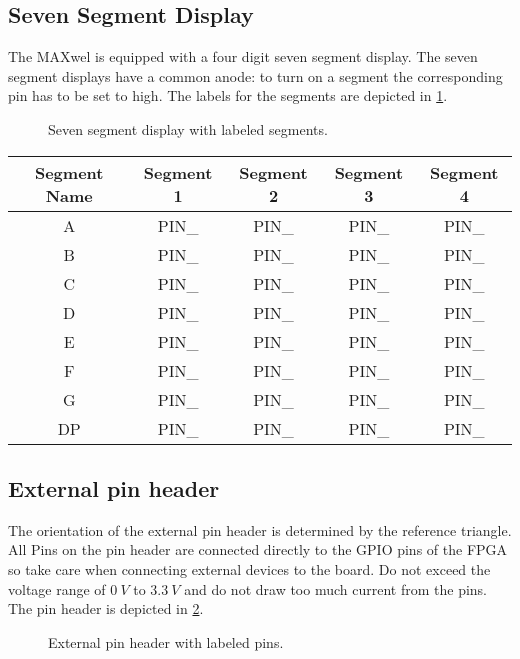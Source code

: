 \subsection{Seven Segment Display}
The MAXwel is equipped with a four digit seven segment display.
The seven segment displays have a common anode: to turn on a segment the corresponding pin has to be set to high.
The labels for the segments are depicted in \cref{fig:seven_segment_display}.

\begin{figure}[h!]
    \centering
    
    \caption{Seven segment display with labeled segments.}
    \label{fig:seven_segment_display}
\end{figure}

\begin{center}
	\begin{tabular}{c c c c c}
		Segment Name & Segment 1 & Segment 2 & Segment 3 & Segment 4 \\
		\hline
		A & PIN\_ & PIN\_ & PIN\_ & PIN\_ \\
		B & PIN\_ & PIN\_ & PIN\_ & PIN\_ \\
		C & PIN\_ & PIN\_ & PIN\_ & PIN\_ \\
		D & PIN\_ & PIN\_ & PIN\_ & PIN\_ \\
		E & PIN\_ & PIN\_ & PIN\_ & PIN\_ \\
		F & PIN\_ & PIN\_ & PIN\_ & PIN\_ \\
		G & PIN\_ & PIN\_ & PIN\_ & PIN\_ \\
		DP & PIN\_ & PIN\_ & PIN\_ & PIN\_ \\
		\hline
	\end{tabular}
\end{center}

\subsection{External pin header}
The orientation of the external pin header is determined by the reference triangle.
All Pins on the pin header are connected directly to the GPIO pins of the FPGA so take care when connecting external devices to the board.
Do not exceed the voltage range of $\SI{0}{V}$ to $\SI{3.3}{V}$ and do not draw too much current from the pins.
The pin header is depicted in \cref{fig:external_pin_header}.

\begin{figure}[h!]
    \centering
    
    \caption{External pin header with labeled pins.}
    \label{fig:external_pin_header}
\end{figure}

